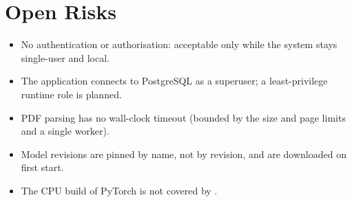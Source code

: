 \section{Open Risks}

\begin{itemize}
  \item No authentication or authorisation: acceptable only while the system stays single-user and local.
  \item The application connects to PostgreSQL as a superuser; a least-privilege runtime role is planned.
  \item PDF parsing has no wall-clock timeout (bounded by the size and page limits and a single worker).
  \item Model revisions are pinned by name, not by revision, and are downloaded on first start.
  \item The CPU build of PyTorch is not covered by .
\end{itemize}
